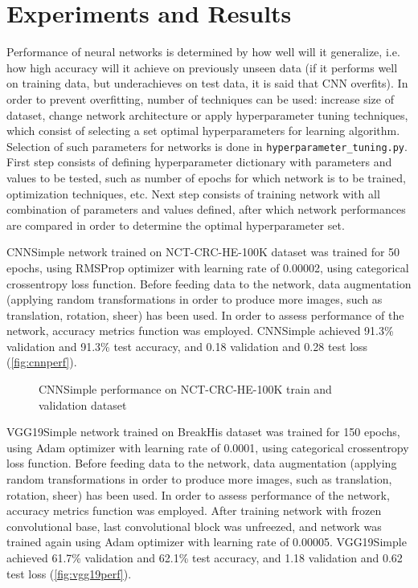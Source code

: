 \section{Experiments and Results}

Performance of neural networks is determined by how well will it generalize, i.e. how high accuracy will it achieve on previously unseen data (if it performs well on training data, but underachieves on test data, it is said that CNN overfits). In order to prevent overfitting, number of techniques can be used: increase size of dataset, change network architecture or apply hyperparameter tuning techniques, which consist of selecting a set optimal hyperparameters for learning algorithm. Selection of such parameters for networks is done in \texttt{hyperparameter\_tuning.py}. First step consists of defining hyperparameter dictionary with parameters and values to be tested, such as number of epochs for which network is to be trained, optimization techniques, etc. Next step consists of training network with all combination of parameters and values defined, after which network performances are compared in order to determine the optimal hyperparameter set.

CNNSimple network trained on NCT-CRC-HE-100K dataset was trained for 50 epochs, using RMSProp optimizer with learning rate of 0.00002, using categorical crossentropy loss function. Before feeding data to the network, data augmentation (applying random transformations in order to produce more images, such as translation, rotation, sheer) has been used. In order to assess performance of the network, accuracy metrics function was employed. CNNSimple achieved 91.3\% validation and 91.3\% test accuracy, and 0.18 validation and 0.28 test loss (\textcolor{red}{\autoref{fig:cnnperf}}).

\begin{figure}[h]
	\centering
	\caption{CNNSimple performance on NCT-CRC-HE-100K train and validation dataset}
	\label{fig:cnnperf}
\end{figure}
\clearpage

VGG19Simple network trained on BreakHis dataset was trained for 150 epochs, using Adam optimizer with learning rate of 0.0001, using categorical crossentropy loss function. Before feeding data to the network, data augmentation (applying random transformations in order to produce more images, such as translation, rotation, sheer) has been used. In order to assess performance of the network, accuracy metrics function was employed. After training network with frozen convolutional base, last convolutional block was unfreezed, and network was trained again using Adam optimizer with learning rate of 0.00005. VGG19Simple achieved 61.7\% validation and 62.1\% test accuracy, and 1.18 validation and 0.62 test loss (\textcolor{red}{\autoref{fig:vgg19perf}}).

